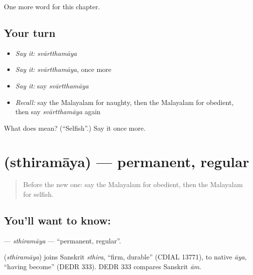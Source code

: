 \begin{grammarlens}[title={What you've built}]
One more word for this chapter.
\end{grammarlens}

\subsection*{Your turn}
\begin{itemize}
\raggedright
  \item \emph{Say it:} \emph{svārtthamāya}
  \item \emph{Say it:} \emph{svārtthamāya}, once more
  \item \emph{Say it:} say \emph{svārtthamāya}
  \item \emph{Recall:} say the Malayalam for naughty, then the Malayalam for obedient, then say \emph{svārtthamāya} again
\end{itemize}

\begin{tcolorbox}[breakable,colback=teal!4,colframe=teal!35!black,title={Before you move on}]
What does  mean? (\textquotedblleft{}Selfish\textquotedblright{}.) Say it once more.
\end{tcolorbox}
\section[\texorpdfstring{\ml{സ്ഥിരമായ} (sthiramāya)}{സ്ഥിരമായ (sthiramāya)}]{ (sthiramāya) — permanent, regular}

\label{lesson:ML-C206-sthiramaya}



\begin{quote}
Before the new one: say the Malayalam for obedient, then the Malayalam for selfish.
\end{quote}

\subsection*{You'll want to know: }
\textbf{} — \emph{sthiramāya} — \textquotedblleft{}permanent, regular\textquotedblright{}.

\begin{cousinweb}
\textbf{} (\emph{sthiramāya}) joins Sanskrit \emph{sthira}, \textquotedblleft{}firm, durable\textquotedblright{} (CDIAL 13771), to native \emph{āya}, \textquotedblleft{}having become\textquotedblright{} (DEDR 333). DEDR 333 compares Sanskrit \emph{ām}.
\end{cousinweb}

